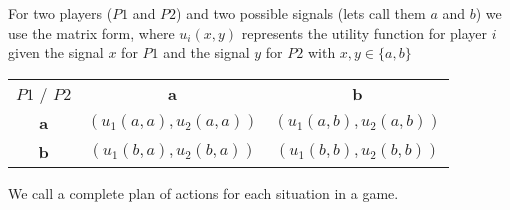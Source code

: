 For two players ($P1$ and $P2$) and two possible signals (lets call them $a$ and $b$) we use the matrix form, where $u_{i}(x, y)$ represents the utility function for player $i$ given the signal $x$ for $P1$ and the signal $y$ for $P2$ with $x, y \in \{ a, b\}$
\begin{center}
	\begin{tabular}{|c|c|c|}
		\hline\hline
  			$P1$ / $P2$ & \textbf{a} & \textbf{b} \\
         		\cline{1-3}
   					\textbf{a} & $( u_{1}(a, a) , u_{2}(a, a))$ & $(u_{1}(a, b), u_{2}(a, b))$	\arrayrulewidth2pt \\
            	\cline{1-3}
   					\textbf{b} & $( u_{1}(b, a), u_{2}(b, a))$ & $(u_{1}(b, b), u_{2}(b, b))$\\ \hline\hline
	\end{tabular}	
\end{center}

We call a  complete plan of actions for each situation in a game.

